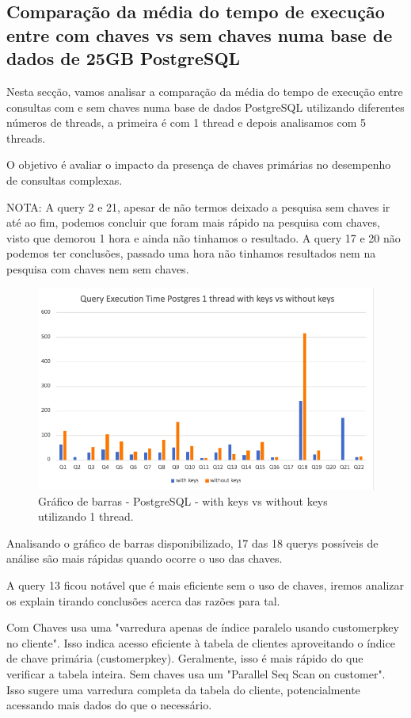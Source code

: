 \documentclass{article}
\begin{document}
\clearpage
\subsection{Comparação da média do tempo de execução entre com chaves vs sem chaves numa base de dados de 25GB PostgreSQL}
Nesta secção, vamos analisar a comparação da média do tempo de execução entre consultas com e sem chaves numa base de dados PostgreSQL utilizando diferentes números de threads, a primeira é com 1 thread e depois analisamos com 5 threads.

O objetivo é avaliar o impacto da presença de chaves primárias no desempenho de consultas complexas.

NOTA: A query 2 e 21, apesar de não termos deixado a pesquisa sem chaves ir até ao fim, podemos concluir que foram mais rápido na pesquisa com chaves, visto que demorou 1 hora e ainda não tinhamos o resultado. A query 17 e 20 não podemos ter conclusões, passado uma hora não tinhamos resultados nem na pesquisa com chaves nem sem chaves.


\begin{figure}[H]
  \centering
  \includegraphics[width=\textwidth]{Graphs/postgres1thread_withkeysvswithoutkeys.png}
  \caption{Gráfico de barras - PostgreSQL - with keys vs without keys utilizando 1 thread.} 
  \label{fig:PKCreation2}
\end{figure}


Analisando o gráfico de barras disponibilizado, 17 das 18 querys possíveis de análise são mais rápidas quando ocorre o uso das chaves.

A query 13 ficou notável que é mais eficiente sem o uso de chaves, iremos analizar os explain tirando conclusões acerca das razões para tal.

Com Chaves usa uma "varredura apenas de índice paralelo usando customer\underline{}pkey no cliente". Isso indica acesso eficiente à tabela de clientes aproveitando o índice de chave primária (customer\underline{}pkey). Geralmente, isso é mais rápido do que verificar a tabela inteira.
Sem chaves usa um "Parallel Seq Scan on customer". Isso sugere uma varredura completa da tabela do cliente, potencialmente acessando mais dados do que o necessário.
\end{document}
